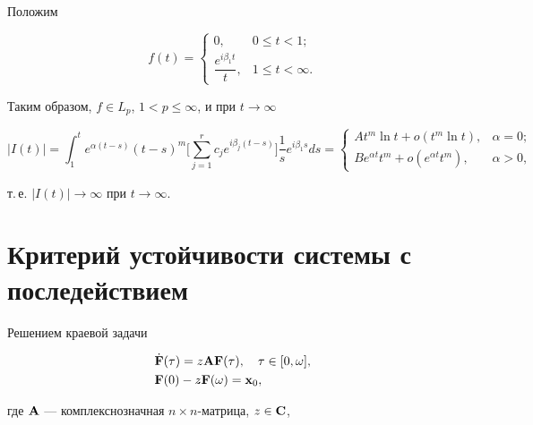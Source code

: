 \begin{pf}
Положим 


$$ 


f(t)= 


\begin{cases} 


0, & 0\le t<1;\\[2mm] 


\dfrac{e^{i\beta_1t}}{t}, & 1\le t<\infty. 


\end{cases} 


$$ 


Таким образом, $f\in L_p$, $1<p\le\infty$, и при $t\to\infty$ 


$$


|I(t)|=\int^t_1 e^{\alpha(t-s)}(t-s)^m\bigg[\sum^r_{j=1} 


c_j e^{i\beta_j(t-s)}\bigg]\frac{1}{s}e^{i\beta_1s}ds=


\begin{cases}


At^m\ln t+o(t^m\ln t), &\alpha=0;\\


B e^{\alpha t}t^m+o(e^{\alpha t}t^m), &\alpha >0,


\end{cases}


$$


т.\,е. $|I(t)|\to\infty$ при $t\to\infty$. 


\end{pf} 


 


 


\section{Критерий устойчивости системы с последействием} 


 


Решением краевой задачи


\begin{align} 


&\Dot{\bold F}(\tau)=z\bold A\bold F(\tau),\quad \tau\in[0,\omega],\\ 


& \bold F(0)-z\bold F(\omega)=\bold x_0, 


\end{align} 


где $\bold A$ --- комплекснозначная $n\times n$-матрица, $z\in\bold C$, 


